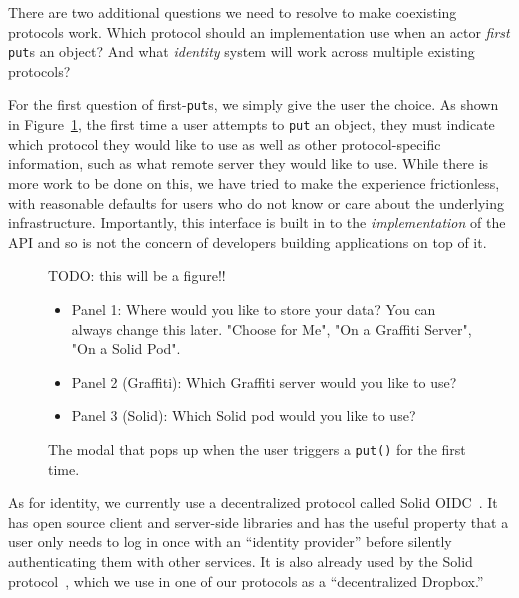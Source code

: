 There are two additional questions we need to resolve to make
coexisting protocols work.
Which protocol should an implementation use
when an actor \emph{first} \texttt{put}s an object?
And what \emph{identity} system will work across multiple existing
protocols?

For the first question of first-\texttt{put}s, we simply give the user the choice.
As shown in Figure~\ref{above-and-below:choose-protocol},
the first time a user attempts to \texttt{put} an object,
they must indicate which protocol they would like to use
as well as other protocol-specific information, such as what
remote server they would like to use.
While there is more work to be done on this,
we have tried to make the experience frictionless, with
reasonable defaults for
users who do not know or care about the underlying infrastructure.
Importantly, this interface is built in to the \emph{implementation}
of the API and so is not the concern of developers building
applications on top of it.


\begin{figure}
    \label{above-and-below:choose-protocol}
    TODO: this will be a figure!!
    \begin{itemize}
    \item
    Panel 1: Where would you like to store your data? You can always change this later.
    "Choose for Me", "On a Graffiti Server", "On a Solid Pod".
    \item
    Panel 2 (Graffiti): Which Graffiti server would you like to use?
    \item
    Panel 3 (Solid): Which Solid pod would you like to use?
    \end{itemize}
    \caption{The modal that pops up when the user triggers a \texttt{put()} for the first time.}
\end{figure}

As for identity, we currently use a decentralized protocol called Solid OIDC~\cite{solidoidc}.
It has open source client and server-side libraries and has
the useful property that a user only needs to log in once
with an ``identity provider'' before silently authenticating
them with other services.
It is also already used by the Solid protocol~\cite{solid},
which we use in one of our protocols as a ``decentralized Dropbox.''

